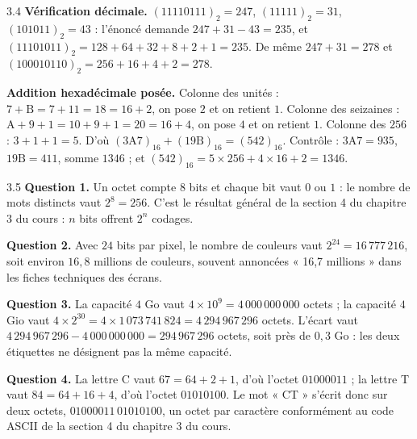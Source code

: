 \begin{corrige}{3.4}
\textbf{Vérification décimale.} $(11110111)_2 = 247$, $(11111)_2 = 31$, $(101011)_2 = 43$ : l'énoncé demande $247 + 31 - 43 = 235$, et $(11101011)_2 = 128 + 64 + 32 + 8 + 2 + 1 = 235$. De même $247 + 31 = 278$ et $(100010110)_2 = 256 + 16 + 4 + 2 = 278$.

\textbf{Addition hexadécimale posée.} Colonne des unités : $7 + \mathrm{B} = 7 + 11 = 18 = 16 + 2$, on pose $2$ et on retient $1$. Colonne des seizaines : $\mathrm{A} + 9 + 1 = 10 + 9 + 1 = 20 = 16 + 4$, on pose $4$ et on retient $1$. Colonne des $256$ : $3 + 1 + 1 = 5$. D'où $(3\mathrm{A7})_{16} + (19\mathrm{B})_{16} = (542)_{16}$. Contrôle : $3\mathrm{A7} = 935$, $19\mathrm{B} = 411$, somme $1346$ ; et $(542)_{16} = 5 \times 256 + 4 \times 16 + 2 = 1346$.
\end{corrige}

\begin{corrige}{3.5}
\textbf{Question 1.} Un octet compte $8$ bits et chaque bit vaut $0$ ou $1$ : le nombre de mots distincts vaut $2^8 = 256$. C'est le résultat général de la section 4 du chapitre 3 du cours : $n$ bits offrent $2^n$ codages.

\textbf{Question 2.} Avec $24$ bits par pixel, le nombre de couleurs vaut $2^{24} = 16\,777\,216$, soit environ $16{,}8$ millions de couleurs, souvent annoncées « 16,7 millions » dans les fiches techniques des écrans.

\textbf{Question 3.} La capacité $4$ Go vaut $4 \times 10^9 = 4\,000\,000\,000$ octets ; la capacité $4$ Gio vaut $4 \times 2^{30} = 4 \times 1\,073\,741\,824 = 4\,294\,967\,296$ octets. L'écart vaut $4\,294\,967\,296 - 4\,000\,000\,000 = 294\,967\,296$ octets, soit près de $0{,}3$ Go : les deux étiquettes ne désignent pas la même capacité.

\textbf{Question 4.} La lettre C vaut $67 = 64 + 2 + 1$, d'où l'octet $01000011$ ; la lettre T vaut $84 = 64 + 16 + 4$, d'où l'octet $01010100$. Le mot « CT » s'écrit donc sur deux octets, $01000011\,01010100$, un octet par caractère conformément au code ASCII de la section 4 du chapitre 3 du cours.
\end{corrige}

